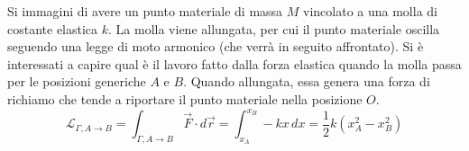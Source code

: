 \documentclass[10pt,a4paper]{book}
\begin{document}
Si immagini di avere un punto materiale di massa $M$ vincolato a una molla di costante elastica $k$. La molla viene allungata, per cui il punto materiale oscilla seguendo una legge di moto armonico (che verrà in seguito affrontato). Si è interessati a capire qual è il lavoro fatto dalla forza elastica quando la molla passa per le posizioni generiche $A$ e $B$. Quando allungata, essa genera una forza di richiamo che tende a riportare il punto materiale nella posizione $O$.
\[
	\boxed{\mathcal{L}_{\Gamma, A \to B}=\int_{\Gamma, A \to B} \vec{F}\cdot d\vec{r}= \int_{x_A}^{x_B} -kx\,dx=\frac{1}{2}k(x_A^2-x_B^2)}
\]
\begin{figure}[htpb]
	\centering
	


	\begin{tikzpicture}[x=0.75pt,y=0.75pt,yscale=-1,xscale=1]


\end{tikzpicture}
\end{figure}
\end{document}
